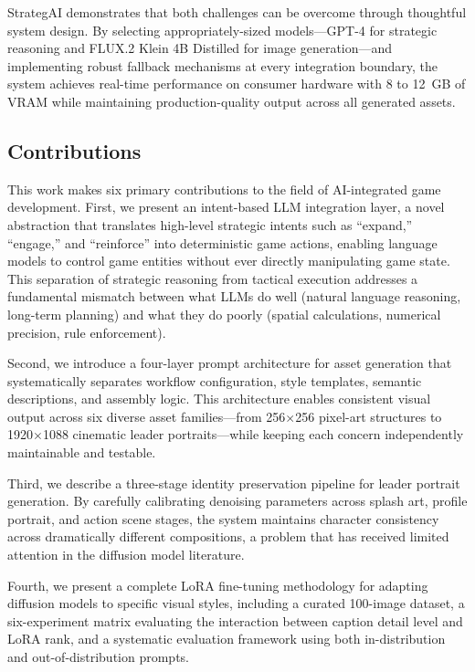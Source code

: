 \documentclass[conference]{IEEEtran}
\begin{document}
StrategAI demonstrates that both challenges can be overcome through thoughtful system design. By selecting appropriately-sized models---GPT-4 for strategic reasoning and FLUX.2 Klein 4B Distilled for image generation---and implementing robust fallback mechanisms at every integration boundary, the system achieves real-time performance on consumer hardware with 8 to 12~GB of VRAM while maintaining production-quality output across all generated assets.

\subsection{Contributions}

This work makes six primary contributions to the field of AI-integrated game development. First, we present an intent-based LLM integration layer, a novel abstraction that translates high-level strategic intents such as ``expand,'' ``engage,'' and ``reinforce'' into deterministic game actions, enabling language models to control game entities without ever directly manipulating game state. This separation of strategic reasoning from tactical execution addresses a fundamental mismatch between what LLMs do well (natural language reasoning, long-term planning) and what they do poorly (spatial calculations, numerical precision, rule enforcement).

Second, we introduce a four-layer prompt architecture for asset generation that systematically separates workflow configuration, style templates, semantic descriptions, and assembly logic. This architecture enables consistent visual output across six diverse asset families---from 256$\times$256 pixel-art structures to 1920$\times$1088 cinematic leader portraits---while keeping each concern independently maintainable and testable.

Third, we describe a three-stage identity preservation pipeline for leader portrait generation. By carefully calibrating denoising parameters across splash art, profile portrait, and action scene stages, the system maintains character consistency across dramatically different compositions, a problem that has received limited attention in the diffusion model literature.

Fourth, we present a complete LoRA fine-tuning methodology for adapting diffusion models to specific visual styles, including a curated 100-image dataset, a six-experiment matrix evaluating the interaction between caption detail level and LoRA rank, and a systematic evaluation framework using both in-distribution and out-of-distribution prompts.
\end{document}

